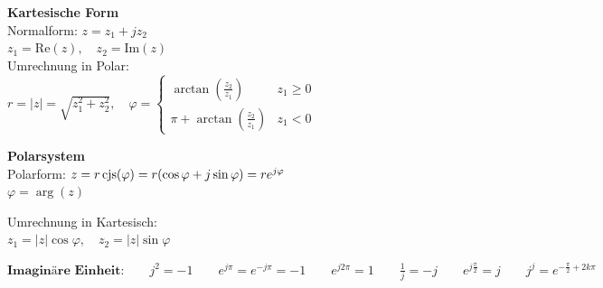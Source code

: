 \begin{minipage}[t]{9.4cm}
	\textbf{Kartesische Form}\\
	Normalform: $z = z_1 +j z_2$\\
	$z_1 = \text{Re}(z), \quad z_2 = \text{Im}(z)$\\
	Umrechnung in Polar:\\
	$r = |z| = \sqrt{z_1^2 + z_2^2}, \quad 
	\varphi = 	\begin{cases} 
                	\arctan(\frac{z_2}{z_1}) &z_1 \geq 0\\
                	\pi + \arctan(\frac{z_2}{z_1}) &z_1 < 0
    			\end{cases}$
\end{minipage}
\begin{minipage}[t]{9.4cm}
	\textbf{Polarsystem}\\
	Polarform: 
	$z = r \operatorname{cjs}(\varphi) = r(\cos{\varphi} + j\sin{\varphi}) = r e^{j \varphi}$\\
	$\varphi = \arg(z)$

	Umrechnung in Kartesisch:\\
	$z_1 = |z| \cos{\varphi}, \quad z_2 = |z| \sin{\varphi}$
\end{minipage}

$\textbf{Imaginäre Einheit:} \qquad j^2 = -1 \qquad e^{j\pi} = e^{-j\pi} = -1 \qquad e^{j2\pi} = 1 \qquad \frac{1}{j} = -j \qquad e^{j\frac{\pi}{2}}= j \qquad j^j = e^{-\frac{\pi}{2}+2k\pi}$

